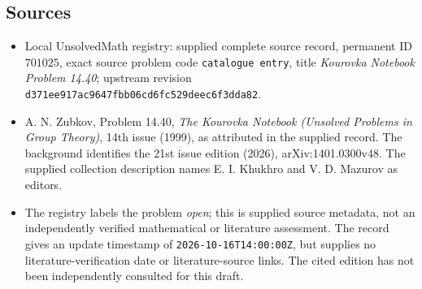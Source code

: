 \documentclass[11pt]{article}
\begin{document}
\subsection{Sources}
\begin{itemize}
\item Local UnsolvedMath registry: supplied complete source record, permanent ID \(701025\), exact source problem code \texttt{catalogue entry}, title \emph{Kourovka Notebook Problem 14.40}; upstream revision \texttt{d371ee917ac9647fbb06cd6fc529deec6f3dda82}.
\item A. N. Zubkov, Problem 14.40, \emph{The Kourovka Notebook (Unsolved Problems in Group Theory)}, 14th issue (1999), as attributed in the supplied record. The background identifies the 21st issue edition (2026), arXiv:1401.0300v48. The supplied collection description names E. I. Khukhro and V. D. Mazurov as editors.
\item The registry labels the problem \emph{open}; this is supplied source metadata, not an independently verified mathematical or literature assessment. The record gives an update timestamp of \texttt{2026-10-16T14:00:00Z}, but supplies no literature-verification date or literature-source links. The cited edition has not been independently consulted for this draft.
\end{itemize}
\end{document}
